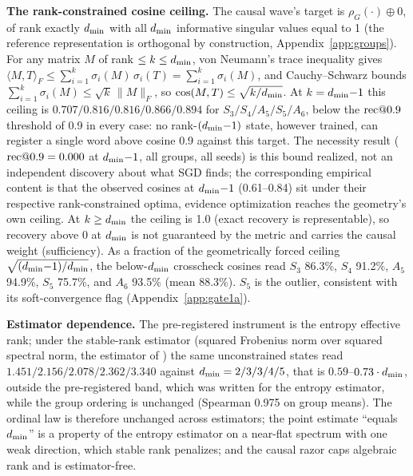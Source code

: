 \textbf{The rank-constrained cosine ceiling.} The causal wave's target
is $\rho_G(\cdot) \oplus 0$, of rank exactly $d_{\min}$ with all $d_{\min}$
informative singular values equal to 1 (the reference representation is
orthogonal by construction, Appendix~\ref{app:groups}). For any matrix
$M$ of rank $\leq k \leq d_{\min}$, von Neumann's trace inequality gives
$\langle M, T\rangle_F \leq \sum_{i=1}^{k} \sigma_i(M)\,\sigma_i(T) =
\sum_{i=1}^{k} \sigma_i(M)$, and Cauchy--Schwarz bounds
$\sum_{i=1}^{k} \sigma_i(M) \leq \sqrt{k}\,\lVert M \rVert_F$, so
$\cos(M, T) \leq \sqrt{k/d_{\min}}$. At $k = d_{\min}{-}1$ this ceiling is
$0.707/0.816/0.816/0.866/0.894$ for $S_3/S_4/A_5/S_5/A_6$, below the
$\mathrm{rec}@0.9$ threshold of 0.9 in every case: no rank-$(d_{\min}{-}1)$
state, however trained, can register a single word above cosine 0.9
against this target. The necessity result ($\mathrm{rec}@0.9 = 0.000$ at
$d_{\min}{-}1$, all groups, all seeds) is this bound realized, not an
independent discovery about what SGD finds; the corresponding empirical
content is that the observed cosines at $d_{\min}{-}1$ (0.61--0.84) sit
under their respective rank-constrained optima, evidence optimization
reaches the geometry's own ceiling. At $k \geq d_{\min}$ the ceiling is
1.0 (exact recovery is representable), so recovery above 0 at $d_{\min}$
is not guaranteed by the metric and carries the causal weight
(sufficiency).
As a fraction of the geometrically forced ceiling
$\sqrt{(d_{\min}{-}1)/d_{\min}}$, the below-$d_{\min}$ crosscheck cosines read
$S_3$ 86.3\%, $S_4$ 91.2\%, $A_5$ 94.9\%, $S_5$ 75.7\%, and $A_6$
93.5\% (mean 88.3\%). $S_5$ is the outlier, consistent with its
soft-convergence flag (Appendix~\ref{app:gate1a}).

\textbf{Estimator dependence.} The pre-registered instrument is the
entropy effective rank; under the stable-rank estimator (squared
Frobenius norm over squared spectral norm, the estimator of
\citet{nazari2026rank}) the same unconstrained states read
$1.451/2.156/2.078/2.362/3.340$ against $d_{\min} = 2/3/3/4/5$, that is
$0.59$--$0.73 \cdot d_{\min}$, outside the pre-registered band, which was
written for the entropy estimator, while the group ordering is
unchanged (Spearman 0.975 on group means). The ordinal law is therefore
unchanged across estimators; the point estimate ``equals $d_{\min}$'' is a property
of the entropy estimator on a near-flat spectrum with one weak
direction, which stable rank penalizes; and the causal razor caps
algebraic rank and is estimator-free.

